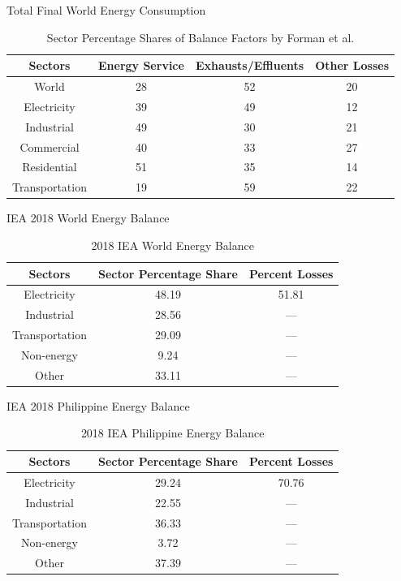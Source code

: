 \begin{frame}{Total Final World Energy Consumption}
	\begin{table}
		\centering
		\caption{Sector Percentage Shares of Balance Factors by Forman et al. \cite{forman2016estimating}}
		\begin{tabular}{cccc}
			\hline
			Sectors & Energy Service & Exhausts/Effluents & Other Losses\\
			\hline
			World & 28 & 52 & 20\\
			Electricity & 39 & 49 & 12\\
			Industrial & 49 & 30 & 21\\
			Commercial & 40 & 33 & 27\\
			Residential & 51 & 35 & 14\\
			Transportation & 19 & 59 & 22\\
			\hline
		\end{tabular}
	\end{table}
\end{frame}

\begin{frame}{IEA 2018 World Energy Balance}\label{worldenergybal}
	\begin{table}
		\centering
		\caption{2018 IEA World Energy Balance\cite{iea2018world}}
		 \begin{tabular}{ccc}
		 \hline
		 Sectors & Sector Percentage Share & Percent Losses\\
		\hline
		Electricity & 48.19 & 51.81 \\
		Industrial & 28.56 & --- \\
		Transportation & 29.09 & ---\\
		Non-energy & 9.24 & ---\\
		Other & 33.11 & --- \\
		\hline
		\end{tabular}
	\end{table}
\end{frame}

\begin{frame}{IEA 2018 Philippine Energy Balance}
	\begin{table}
		\centering
		\caption{2018 IEA Philippine Energy Balance\cite{IEA2018PhilippineEnergyBalance}}
		 \begin{tabular}{ccc}
		 \hline
		 Sectors & Sector Percentage Share & Percent Losses\\
		\hline
		Electricity & 29.24 & 70.76 \\
		Industrial & 22.55 & --- \\
		Transportation & 36.33 & ---\\
		Non-energy & 3.72 & ---\\
		Other & 37.39 & --- \\
		\hline
		\end{tabular}
	\end{table}
\end{frame}

